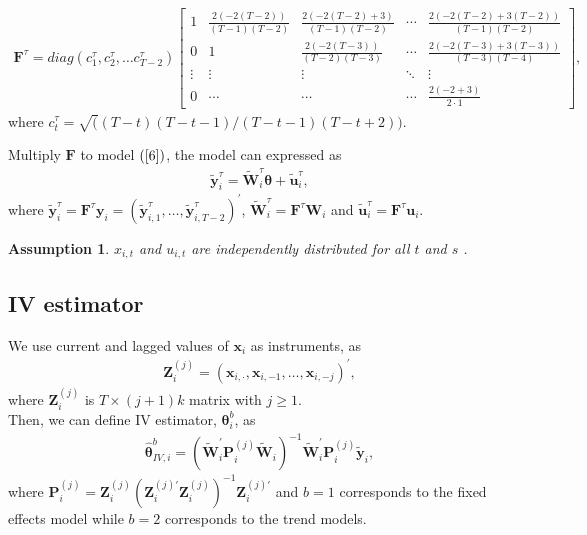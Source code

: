 \documentclass[12pt,a4paper,hyperref]{article}
\newtheorem{myAssu}{Assumption}
\begin{document}
\begin{align}
\boldsymbol{F}^{\tau}=diag(c^{\tau}_{1}, c^{\tau}_{2}, \ldots c^{\tau}_{T-2})
\begin{bmatrix}
1 & \frac{2(-2(T-2))}{(T-1)(T-2)} & \frac{2(-2(T-2)+3)}{(T-1)(T-2)} & \cdots & \frac{2(-2(T-2)+3(T-2))}{(T-1)(T-2)} \\
0 & 1 & \frac{2(-2(T-3))}{(T-2)(T-3)} & \cdots & \frac{2(-2(T-3)+3(T-3))}{(T-3)(T-4)} \\
\vdots &\vdots & \vdots & \ddots  &\vdots \\
0 & \cdots & \cdots & \cdots & \frac{2(-2+3)}{2 \cdot 1}
\end{bmatrix}, \label {7}
\end{align}   
where $c^{\tau}_{t}=\sqrt((T-t)(T-t-1)/(T-t-1)(T-t+2)).$

Multiply $\boldsymbol{F}$ to model $(\ref{6})$, the model can expressed as  
\begin{align}
\tilde{\boldsymbol{y}}^{\tau}_{i}= \tilde{\boldsymbol{W}}^{\tau}_{i}\boldsymbol{\theta}+\tilde{\boldsymbol{u}}^{\tau}_{i},
\end{align}
where $\tilde{\boldsymbol{y}}^{\tau}_{i}=\boldsymbol{F}^{\tau}\boldsymbol{y}_{i}= \left(\tilde{\boldsymbol{y}}^{\tau}_{i,1}, \ldots, \tilde{\boldsymbol{y}}^{\tau}_{i,T-2} \right)^{'}$,  $\tilde{\boldsymbol{W}}^{\tau}_{i}=\boldsymbol{F}^{\tau}\boldsymbol{W}_{i}$ and $\tilde{\boldsymbol{u}}^{\tau}_{i}=\boldsymbol{F}^{\tau}\boldsymbol{u}_{i}.$







\begin{myAssu}
$x_{i,t}$ and $u_{i,t}$ are independently distributed for all $t$ and $s$ .
\end{myAssu}


\subsection{IV estimator}
We use current and lagged values of $\boldsymbol{x}_{i}$ as instruments, as
\begin{align}
\boldsymbol{Z}^{(j)}_{i}=\left( \boldsymbol{x}_{i,\cdot}, \boldsymbol{x}_{i,-1},\ldots, \boldsymbol{x}_{i,-j} \right)^{'},
\end{align}
where $\boldsymbol{Z}^{(j)}_{i}$ is $T \times  (j+1)k$ matrix with $j \geq 1$. \\




Then, we can define IV estimator, $\boldsymbol{\theta}^{b}_{i}$, as
\begin{align}
\hat{\boldsymbol{\theta}}^{b}_{IV,i}= \left( \tilde{\boldsymbol{W}}^{'}_{i}\boldsymbol{P}^{(j)}_{i} \tilde{\boldsymbol{W}}_{i} \right)^{-1} \tilde{\boldsymbol{W}}^{'}_{i}\boldsymbol{P}^{(j)}_{i} \tilde{\boldsymbol{y}}_{i},
\end{align}
where $\boldsymbol{P}^{(j)}_{i}=\boldsymbol{Z}^{(j)}_{i} \left(\boldsymbol{Z}^{(j)'}_{i}\boldsymbol{Z}^{(j)}_{i} \right)^{-1}\boldsymbol{Z}^{(j)'}_{i}$ and $b=1$ corresponds to the fixed effects model while $b=2$ corresponds to the trend models. 
\end{document}
